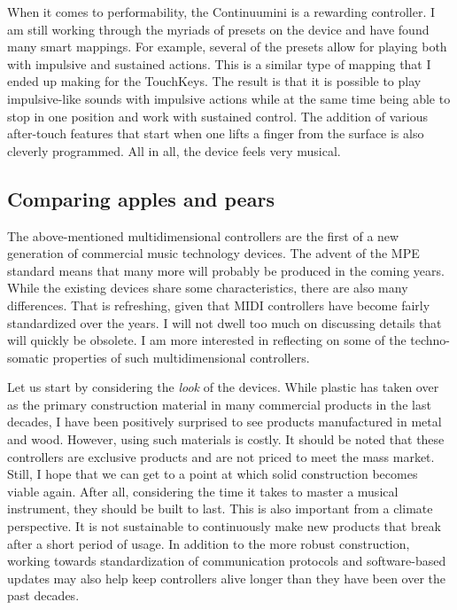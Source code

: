 When it comes to performability, the Continuumini is a rewarding controller. I am still working through the myriads of presets on the device and have found many smart mappings. For example, several of the presets allow for playing both with impulsive and sustained actions. This is a similar type of mapping that I ended up making for the TouchKeys. The result is that it is possible to play impulsive-like sounds with impulsive actions while at the same time being able to stop in one position and work with sustained control. The addition of various after-touch features that start when one lifts a finger from the surface is also cleverly programmed. All in all, the device feels very musical.


\subsection{Comparing apples and pears}

The above-mentioned multidimensional controllers are the first of a new generation of commercial music technology devices. The advent of the MPE standard means that many more will probably be produced in the coming years. While the existing devices share some characteristics, there are also many differences. That is refreshing, given that MIDI controllers have become fairly standardized over the years. I will not dwell too much on discussing details that will quickly be obsolete. I am more interested in reflecting on some of the techno-somatic properties of such multidimensional controllers.

Let us start by considering the \emph{look} of the devices. While plastic has taken over as the primary construction material in many commercial products in the last decades, I have been positively surprised to see products manufactured in metal and wood. However, using such materials is costly. It should be noted that these controllers are exclusive products and are not priced to meet the mass market. Still, I hope that we can get to a point at which solid construction becomes viable again. After all, considering the time it takes to master a musical instrument, they should be built to last. This is also important from a climate perspective. It is not sustainable to continuously make new products that break after a short period of usage. In addition to the more robust construction, working towards standardization of communication protocols and software-based updates may also help keep controllers alive longer than they have been over the past decades.

